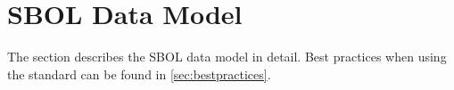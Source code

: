 
\section{SBOL Data Model}\label{sec:model}

The section describes the SBOL data model in detail.  Best practices when using the standard can be found in \ref{sec:bestpractices}.





















